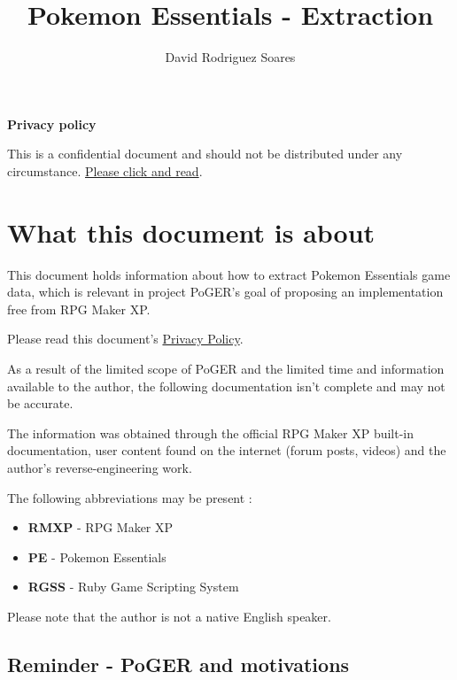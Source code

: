 \documentclass[11pt]{article}
\title{Pokemon Essentials - Extraction}
\author{David Rodriguez Soares}
\begin{document}
\maketitle

\vspace*{\fill}

\textbf{Privacy policy}

This is a confidential document and should not be distributed under any circumstance. \hyperref[sec:privacypolice]{Please click and read}.

\vspace{20mm}

\newpage

\begingroup
\hypersetup{linkcolor=black}
\tableofcontents
\endgroup

\newpage
\section{What this document is about}

This document holds information about how to extract Pokemon Essentials game data, which is relevant in project PoGER's goal of proposing an implementation free from RPG Maker XP.

Please read this document's \hyperref[sec:privacypolice]{Privacy Policy}.

As a result of the limited scope of PoGER and the limited time and information available to the author, the following documentation isn't complete and may not be accurate.

The information was obtained through the official RPG Maker XP built-in documentation, user content found on the internet (forum posts, videos) and the author's reverse-engineering work.

The following abbreviations may be present :
\begin{itemize}
	\item \textbf{RMXP} - RPG Maker XP
	\item \textbf{PE} - Pokemon Essentials
	\item \textbf{RGSS} - Ruby Game Scripting System
\end{itemize}

Please note that the author is not a native English speaker.


\subsection{Reminder - PoGER and motivations}
\end{document}
